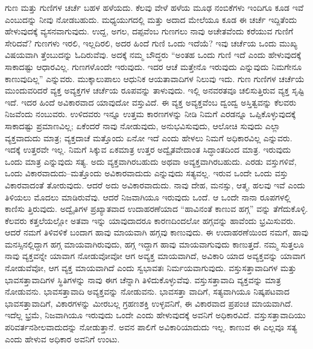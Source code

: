 ಗುಣ ಮತ್ತು ಗುಣಿಗಳ ಚರ್ಚೆ ಬಹಳ ಹಳೆಯದು. ಕೆಲವು ವೇಳೆ ಹಳೆಯ ಮೂಢ ನಂಬಿಕೆಗಳು ಇಂದಿಗೂ ಕೂಡ ಇವೆ ಎಂಬುದನ್ನು ನೀವು ನೋಡಬಹುದು. ಮಧ್ಯಯುಗದಲ್ಲಿ ಮತ್ತು ಅದಾದ ಮೇಲೆಯೂ ಕೂಡ ಈ ಚರ್ಚೆ ಇದ್ದಿತೆಂದು ಹೇಳುವುದಕ್ಕೆ ವ್ಯಸನವಾಗುವುದು. ಉದ್ದ, ಅಗಲ, ದಪ್ಪವೆಂಬ ಗುಣಗಲು ನಾವು ಅಚೇತವೆಂದು ಕರೆಯುವ ಗುಣಿಗೆ ಸೇರಿದವೆ? ಗುಣಗಳು ಇರಲಿ, ಇಲ್ಲದಿರಲಿ, ಅದರ ಹಿಂದೆ ಗುಣಿ ಒಂದು ಇದೆಯೆ? ಇವು ಚರ್ಚೆಯ ಒಂದು ಮುಖ್ಯ ವಿಷಯವಾಗಿ ತ್ತೆಂಬುದನ್ನು ಓದಿರುವೆವು. ಅದಕ್ಕೆ ನಮ್ಮ ಬೌದ್ಧರು “ಅಂತಹ ಒಂದು ಗುಣಿ ಇದೆ ಎಂದು ಹೇಳುವುದಕ್ಕೆ ಸಾಕಾದಷ್ಟು ಆಧಾರವಿಲ್ಲ. ಗುಣಗಳೊಂದೇ ಇರುವುದು. ಇದರ ಆಚೆ ಮತ್ತೇನೊ ಇರುವುದು ಎನ್ನುವುದು ನಿಮಗೇನೂ ಕಾಣುವುದಿಲ್ಲ” ಎನ್ನುವರು. ಮುಕ್ಕಾಲುಪಾಲು ಆಧುನಿಕ ಆಯತಾವಾದಿಗಳ ನಿಲುವು ಇದು. ಗುಣ ಗುಣಿಗಳ ಚರ್ಚೆಯೆ ಮುಂದುವರಿದರೆ ವ್ಯಕ್ತ ಅವ್ಯಕ್ತಗಳ ಚರ್ಚೆಯ ರೂಪವನ್ನು ತಾಳುವುದು. ಇಲ್ಲಿ ಅನವರತವೂ ಚಲಿಸುತ್ತಿರುವ ವ್ಯಕ್ತ ಸೃಷ್ಟಿ ಇದೆ. ಇದರ ಹಿಂದೆ ಅವಿಕಾರವಾದ ಯಾವುದೋ ವಸ್ತುವಿದೆ. ಈ ವ್ಯಕ್ತ ಅವ್ಯಕ್ತವೆಂಬ ದ್ವಂದ್ವ ಅಸ್ತಿತ್ವವನ್ನು ಕೆಲವರು ನಿಜವೆಂದು ನಂಬುವರು. ಉಳಿದವರು ಇನ್ನೂ ಉತ್ತಮ ಕಾರಣಗಳನ್ನು ನೀಡಿ ನಿಮಗೆ ಎರಡನ್ನೂ ಒಪ್ಪಿಕೊಳ್ಳುವುದಕ್ಕೆ ಸಾಕಾದಷ್ಟು ಪ್ರಮಾಣವಿಲ್ಲ; ಏಕೆಂದರೆ ನಾವು ನೋಡುವುದು, ಅನುಭವಿಸುವುದು, ಆಲೋಚಿ ಸುವುದು ಎಲ್ಲಾ ವ್ಯಕ್ತವಾದುದು ಮಾತ್ರ; ವ್ಯಕ್ತದಾಚೆ ಮತ್ತೊಂದು ಏನೋ ಇದೆ ಎಂದು ಹೇಳಲು ನಿಮಗೆ ಅಧಿಕಾರವಿಲ್ಲ ಎನ್ನುವರು. ಇದಕ್ಕೆ ಉತ್ತರವೇ ಇಲ್ಲ. ನಿಮಗೆ ಸಿಕ್ಕುವ ಏಕಮಾತ್ರ ಉತ್ತರ ಅದ್ವೈತವೇದಾಂತ ಸಿದ್ಧಾಂತದಿಂದ ಮಾತ್ರ. ಇರುವುದು ಒಂದು ಮಾತ್ರ ಎನ್ನುವುದು ಸತ್ಯ. ಅದು ವ್ಯಕ್ತವಾಗಿರಬಹುದು ಅಥವಾ ಅವ್ಯಕ್ತವಾಗಿರಬಹುದು. ಎರಡು ವಸ್ತುಗಳಿವೆ, ಒಂದು ವಿಕಾರವಾದುದು–ಮತ್ತೊಂದು ಅವಿಕಾರವಾದುದು ಎನ್ನುವುದು ಸತ್ಯವಲ್ಲ. ಇರುವ ಒಂದೇ ಒಂದು ವಸ್ತು ವಿಕಾರವಾದಂತೆ ತೋರುವುದು. ಆದರೆ ಅದು ಅವಿಕಾರವಾದುದು. ನಾವು ದೇಹ, ಮನಸ್ಸು, ಆತ್ಮ, ಹಲವು ಇವೆ ಎಂದು ತಿಳಿಯಲು ಮೊದಲು ಮಾಡಿರುವೆವು. ಆದರೆ ನಿಜವಾಗಿಯೂ ಇರುವುದು ಒಂದೆ. ಆ ಒಂದೇ ನಾನಾ ರೂಪಗಳಲ್ಲಿ ಕಾಣಿಸು ತ್ತಿರುವುದು. ಅದ್ವೈತಿಗಳ ಪ್ರಖ್ಯಾತವಾದ ಉದಾಹರಣೆಯಾದ “ಹಾವಿನಂತೆ ಕಾಣುವ ಹಗ್ಗ” ವನ್ನು ತೆಗೆದುಕೊಳ್ಳಿ. ಕೆಲವರು ಕತ್ತಲೆಯಲ್ಲೋ ಅತವಾ ಇನ್ನು ಯಾವುದಾದರೂ ಕಾರಣದಿಂದಲೋ ಹಗ್ಗವನ್ನು ಹಾವೆಂದು ಭ್ರಮಿಸುವರು. ಆದರೆ ನಮಗೆ ತಿಳಿವಳಿಕೆ ಬಂದಾಗ ಹಾವು ಮಾಯವಾಗಿ ಹಗ್ಗವು ಕಾಣುವುದು. ಈ ಉದಾಹರಣೆಯಿಂದ ನಮಗೆ, ಹಾವು ಮನಸ್ಸಿನಲ್ಲಿದ್ದಾಗ ಹಗ್ಗ ಮಾಯವಾಗಿರುವುದು, ಹಗ್ಗ ಇದ್ದಾಗ ಹಾವು ಮಾಯವಾಗುವುದು ಕಾಣುತ್ತದೆ. ನಮ್ಮ ಸುತ್ತಲೂ ನಾವು ವ್ಯಕ್ತವನ್ನೇ ಯಾವಾಗ ನೋಡುವೋವೋ ಆಗ ಅವ್ಯಕ್ತ ಮಾಯವಾಗಿದೆ, ಅವಿಕಾರಿ ಯಾದ ಅವ್ಯಕ್ತವನ್ನು ಯಾವಾಗ ನೋಡುವೆವೋ, ಆಗ ವ್ಯಕ್ತ ಮಾಯವಾಗಿದೆ ಎಂದು ಸ್ವಭಾವತಃ ನಿರ್ಮಯವಾಗುವುದು. ವಸ್ತುಸತ್ತಾವಾದಿಗಳ ಮತ್ತು ಭಾವಸತ್ತಾವಾದಿಗಳ ಸ್ಥಿತಿಗಳನ್ನು ನಾವು ಈಗ ಚೆನ್ನಾಗಿ ತಿಳಿದುಕೊಳ್ಳುವೆವು. ವಸ್ತುಸತ್ತಾವಾದಿ ವ್ಯಕ್ತವನ್ನು ಮಾತ್ರ ನೋಡುವನು. ಭಾವಸತ್ತಾವಾದಿ ಅವ್ಯಕ್ತವನ್ನು ನೋಡುವನು. ಭಾವಸತ್ತಾ ವಾದಿಗೆ, ಸತ್ಯವಾಗಿಯೂ ನಿಷ್ಕಪಟವಾದ ಭಾವಸತ್ತಾವಾದಿಗೆ, ವಿಕಾರಗಳನ್ನು ಮೀರಬಲ್ಲ ಗ್ರಹಣಶಕ್ತಿ ಉಳ್ಳವನಿಗೆ, ಈ ವಿಕಾರವಾದ ಪ್ರಪಂಚ ಮಾಯವಾಗಿದೆ. ಇದೆಲ್ಲ ಭ್ರಮೆ, ನಿಜವಾಗಿಯೂ ಇರುವುದು ಒಂದೇ ಎಂದು ಹೇಳುವುದಕ್ಕೆ ಅವನಿಗೆ ಅಧಿಕಾರವಿದೆ. ವಸ್ತುಸತ್ತಾವಾದಿಯು ಪರಿವರ್ತನಶೀಲವಾದುದನ್ನು ನೋಡುತ್ತಾನೆ. ಅವನ ಪಾಲಿಗೆ ಅವಿಕಾರಿಯಾದುದು ಇಲ್ಲ. ಕಾಣುವ ಈ ಎಲ್ಲವೂ ಸತ್ಯ ಎಂದು ಹೇಳುವ ಅಧಿಕಾರ ಅವನಿಗೆ ಉಂಟು.

